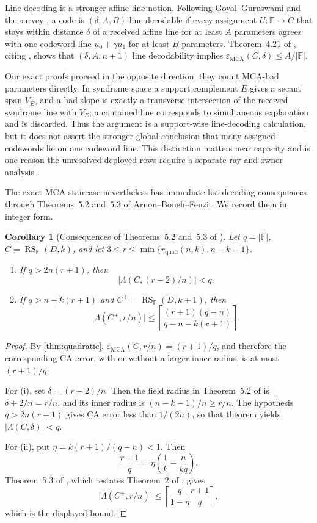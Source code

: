 \documentclass[11pt,a4paper]{amsart}
\numberwithin{equation}{section}
\newtheorem{corollary}[theorem]{Corollary}
\theoremstyle{remark}
\DeclareMathOperator{\RS}{RS}
\DeclareMathOperator{\MCA}{MCA}
\newcommand{\F}{\mathbb F}
\newcommand{\eps}{\varepsilon}
\newcommand{\abs}[1]{\lvert#1\rvert}
\newcommand{\ceil}[1]{\left\lceil#1\right\rceil}
\begin{document}
Line decoding is a stronger affine-line notion.  Following Goyal--Guruswami and the survey \cite[Definition~4.20]{ABF26}, a code is $(\delta,A,B)$ line-decodable if every assignment $U:\F\to C$ that stays within distance $\delta$ of a received affine line for at least $A$ parameters agrees with one codeword line $u_0+\gamma u_1$ for at least $B$ parameters.  Theorem~4.21 of \cite{ABF26}, citing \cite{GG25}, shows that $(\delta,A,n+1)$ line decodability implies $\eps_{\MCA}(C,\delta)\le A/\abs\F$.

Our exact proofs proceed in the opposite direction: they count MCA-bad parameters directly.  In syndrome space a support complement $E$ gives a secant span $V_E$, and a bad slope is exactly a transverse intersection of the received syndrome line with $V_E$; a contained line corresponds to simultaneous explanation and is discarded.  Thus the argument is a support-wise line-decoding calculation, but it does not assert the stronger global conclusion that many assigned codewords lie on one codeword line.  This distinction matters near capacity and is one reason the unresolved deployed rows require a separate ray and owner analysis \cite{ChoGF26,ChoComp26}.

The exact MCA staircase nevertheless has immediate list-decoding consequences through Theorems~5.2 and~5.3 of Arnon--Boneh--Fenzi \cite{ABF26}.  We record them in integer form.

\begin{corollary}[Consequences of Theorems~5.2 and~5.3 of \cite{ABF26}]\label{cor:list-consequences}
Let $q=\abs\F$, $C=\RS_{\F}(D,k)$, and let $3\le r\le\min\{r_{\mathrm{quad}}(n,k),n-k-1\}$.
\begin{enumerate}[label=\textup{(\roman*)},leftmargin=*]
\item If $q>2n(r+1)$, then
\[
 \abs{\Lambda(C,(r-2)/n)}<q.
\]
\item If $q>n+k(r+1)$ and $C^+=\RS_{\F}(D,k+1)$, then
\[
 \abs{\Lambda(C^+,r/n)}
 \le \ceil{\frac{(r+1)(q-n)}{q-n-k(r+1)}}.
\]
\end{enumerate}
\end{corollary}

\begin{proof}
By \cref{thm:quadratic}, $\eps_{\MCA}(C,r/n)=(r+1)/q$, and therefore the corresponding CA error, with or without a larger inner radius, is at most $(r+1)/q$.

For (i), set $\delta=(r-2)/n$.  Then the field radius in Theorem~5.2 of \cite{ABF26} is $\delta+2/n=r/n$, and its inner radius is $(n-k-1)/n\ge r/n$.  The hypothesis $q>2n(r+1)$ gives CA error less than $1/(2n)$, so that theorem yields $\abs{\Lambda(C,\delta)}<q$.

For (ii), put $\eta=k(r+1)/(q-n)<1$.  Then
\[
 \frac{r+1}{q}=\eta\left(\frac1k-\frac{n}{kq}\right).
\]
Theorem~5.3 of \cite{ABF26}, which restates Theorem~2 of \cite{CS25}, gives
\[
 \abs{\Lambda(C^+,r/n)}\le
 \ceil{\frac{q}{1-\eta}\frac{r+1}{q}},
\]
which is the displayed bound.
\end{proof}
\end{document}
